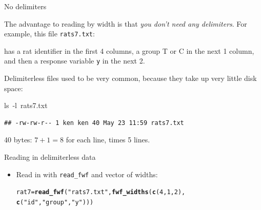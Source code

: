 \documentclass[unknownkeysallowed]{beamer}\usepackage[]{graphicx}\usepackage[]{color}
\makeatletter
\newcommand{\hlnum}[1]{\textcolor[rgb]{0.686,0.059,0.569}{#1}}%
\newcommand{\hlstr}[1]{\textcolor[rgb]{0.192,0.494,0.8}{#1}}%
\newcommand{\hlopt}[1]{\textcolor[rgb]{0,0,0}{#1}}%
\newcommand{\hlstd}[1]{\textcolor[rgb]{0.345,0.345,0.345}{#1}}%
\newcommand{\hlkwb}[1]{\textcolor[rgb]{0.69,0.353,0.396}{#1}}%
\newcommand{\hlkwc}[1]{\textcolor[rgb]{0.333,0.667,0.333}{#1}}%
\newcommand{\hlkwd}[1]{\textcolor[rgb]{0.737,0.353,0.396}{\textbf{#1}}}%
\newenvironment{kframe}{%
 \def\at@end@of@kframe{}%
 \ifinner\ifhmode%
  \def\at@end@of@kframe{\end{minipage}}%
  \begin{minipage}{\columnwidth}%
 \fi\fi%
 \def\FrameCommand##1{\hskip\@totalleftmargin \hskip-\fboxsep
 \colorbox{shadecolor}{##1}\hskip-\fboxsep
     \hskip-\linewidth \hskip-\@totalleftmargin \hskip\columnwidth}%
 \MakeFramed {\advance\hsize-\width
   \@totalleftmargin\z@ \linewidth\hsize
   \@setminipage}}%
 {\par\unskip\endMakeFramed%
 \at@end@of@kframe}
\newenvironment{knitrout}{}{} %
\makeatother
\begin{document}
\begin{frame}[fragile]{No delimiters}
  
  The advantage to reading by width is that \emph{you don't need any
    delimiters}. For example, this file \texttt{rats7.txt}:
  


has a rat identifier in the first 4 columns, a group T or C in the
next 1 column, and then a response variable \texttt{y} in the next 2.

Delimiterless files used to be very common, because they take up
  very little disk space:
  
\begin{knitrout}
\color{fgcolor}\begin{kframe}
\noindent
\ttfamily
\hlstd{}\hlkwc{ls\ }\hlstd{}\hlopt{{-}}\hlstd{l\ rats7.txt}\hspace*{\fill}
\mbox{}
\normalfont

\begin{verbatim}
## -rw-rw-r-- 1 ken ken 40 May 23 11:59 rats7.txt
\end{verbatim}
\end{kframe}
\end{knitrout}

40 bytes: $7+1=8$ for each line, times 5 lines.

  
\end{frame}

\begin{frame}[fragile]{Reading in delimiterless data}
  
  \begin{itemize}
  \item Read in with \texttt{read\_fwf} and vector of widths:
    
\begin{knitrout}
\color{fgcolor}\begin{kframe}
\begin{alltt}
\hlstd{rat7}\hlkwb{=}\hlkwd{read_fwf}\hlstd{(}\hlstr{"rats7.txt"}\hlstd{,}\hlkwd{fwf_widths}\hlstd{(}\hlkwd{c}\hlstd{(}\hlnum{4}\hlstd{,}\hlnum{1}\hlstd{,}\hlnum{2}\hlstd{),}
       \hlkwd{c}\hlstd{(}\hlstr{"id"}\hlstd{,}\hlstr{"group"}\hlstd{,}\hlstr{"y"}\hlstd{)))}
\end{alltt}


{\ttfamily\noindent\itshape\color{messagecolor}{\#\# Parsed with column specification:\\\#\# cols(\\\#\#\ \  id = col\_character(),\\\#\#\ \  group = col\_character(),\\\#\#\ \  y = col\_integer()\\\#\# )}}\end{kframe}
\end{knitrout}
  \end{itemize}
  
\end{frame}
\end{document}
